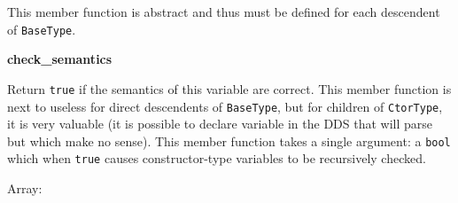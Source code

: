 \begin{description}
This member function is abstract and thus must be defined for each descendent
of {\tt BaseType}.

\item {\bf check\_semantics}


Return {\tt true} if the semantics of this variable are correct. This member
function is next to useless for direct descendents of {\tt BaseType}, but for
children of {\tt CtorType}, it is very valuable (it is possible to declare
variable in the DDS that will parse but which make no sense).  This member
function takes a single argument: a {\tt bool} which when {\tt true} causes
constructor-type variables to be recursively checked.

\end{description}

Array:

